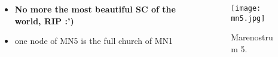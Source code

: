 \begin{frame}
{\begin{columns}
\begin{column}{0.4\textwidth}
\begin{itemize}
				\item \textbf{No more the most beautiful SC of the world, RIP :')}
				\item one node of MN5 is the full church of MN1
			\end{itemize}
		\end{column}
		\begin{column}{0.6\textwidth}
			\begin{figure}[H]
				\centering
				\texttt{[image: mn5.jpg]}
				\caption{Marenostrum 5.}
			\end{figure}
		\end{column}
		\end{columns}
	}
\end{frame}
